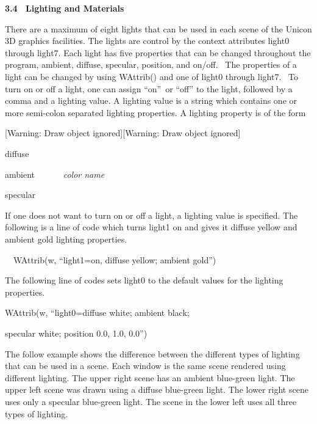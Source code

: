 \documentclass[letterpaper]{article}
\begin{document}
\bigskip


\bigskip


\bigskip

{\bfseries
3.4 \ Lighting and Materials}


\bigskip

{
There are a maximum of eight lights that can be used in each scene of the Unicon 3D graphics facilities. The lights are
control by the context attributes \textsf{light0} through \textsf{light7}. Each light has five properties that can be
changed throughout the program, ambient, diffuse, specular, position, and on/off. \ The properties of a light can be
changed by using \textsf{WAttrib()} and one of \textsf{light0} through \textsf{light7}. \ To turn on or off a light,
one can assign \textsf{{}``on''}\texttt{ }or \textsf{{}``off''} to the light, followed by a comma and a lighting value.
A lighting value is a string which contains one or more semi-colon separated lighting properties. A lighting property
is of the form }

[Warning: Draw object ignored][Warning: Draw object ignored]

{\sffamily
diffuse}

{
\textsf{ambient} \ \ \ \ \ \ \textsf{\textit{color name}}}

{\sffamily
specular}


\bigskip

{
If one does not want to turn on or off a light, a lighting value is specified. The following is a line of code which
turns \textsf{light1} on and gives it diffuse yellow and ambient gold lighting properties. }


\bigskip

{
\ \ \textsf{WAttrib(w, ``light1=on, diffuse yellow; ambient gold'')}}


\bigskip

{
The following line of codes sets \textsf{light0} to the default values for the lighting properties. }


\bigskip

{\sffamily
WAttrib(w, ``light0=diffuse white; ambient black; }

{\sffamily
specular white; position 0.0, 1.0, 0.0'')}


\bigskip

{
The follow example shows the difference between the different types of lighting that can be used in a scene. Each window
is the same scene rendered using different lighting. The upper right scene has an ambient blue-green light. The upper
left scene was drawn using a diffuse blue-green light. The lower right scene uses only a specular blue-green light. The
scene in the lower left uses all three types of lighting.}
\end{document}

